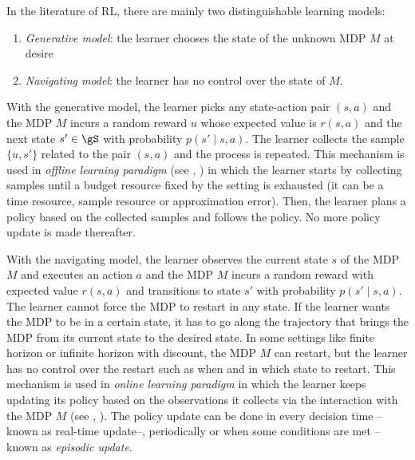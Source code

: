 
In the literature of RL, there are mainly two distinguishable learning models:
\begin{enumerate}[label=(\roman*)]
    \item \emph{Generative model}: the learner chooses the state of the unknown MDP $M$ at desire
    \item \emph{Navigating model}: the learner has no control over the state of $M$.
\end{enumerate}
With the generative model, the learner picks any state-action pair $(s,a)$ and the MDP $M$ incurs a random reward $u$ whose expected value is $r(s,a)$ and the next state $s'\in\gS$ with probability $p(s'\mid s,a)$.
The learner collects the sample $\{u,s'\}$ related to the pair $(s,a)$ and the process is repeated.
This mechanism is used in \emph{offline learning paradigm} (see  \eg, \cite{lange2012batch, levine2020offline}) in which the learner starts by collecting samples until a budget resource fixed by the setting is exhausted (it can be a time resource, sample resource or approximation error). Then, the learner plans a policy based on the collected samples and follows the policy.
No more policy update is made thereafter.

With the navigating model, the learner observes the current state $s$ of the MDP $M$ and executes an action $a$ and the MDP $M$ incurs a random reward with expected value $r(s,a)$ and transitions to state $s'$ with probability $p(s'\mid s,a)$.
The learner cannot force the MDP to restart in any state.
If the learner wants the MDP to be in a certain state, it has to go along the trajectory that brings the MDP from its current state to the desired state.
In some settings like finite horizon or infinite horizon with discount, the MDP $M$ can restart, but the learner has no control over the restart such as when and in which state to restart.
This mechanism is used in \emph{online learning paradigm} in which the learner keeps updating its policy based on the observations it collects via the interaction with the MDP $M$ (see \eg, \cite{jaksch2010near, osband2013more, azar2017minimax, ouyang2017learning,zanette2019tighter}).
The policy update can be done in every decision time --known as real-time update--, periodically or when some conditions are met --known as \emph{episodic update}.

